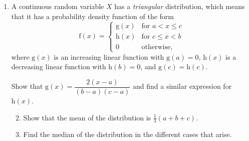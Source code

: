 \documentclass[a4, 11pt]{report}
\newlength{\qspace}
\newcounter{qnumber}
\newenvironment{question}%
 {\vspace{\qspace}
  \begin{enumerate}[\bfseries 1\quad][10]%
    \setcounter{enumi}{\value{qnumber}}%
    \item%
 }
{
  \end{enumerate}
  \filbreak
  \stepcounter{qnumber}
 }
\newenvironment{questionparts}[1][1]%
 {
  \begin{enumerate}[\bfseries (i)]%
    \setcounter{enumii}{#1}
    \addtocounter{enumii}{-1}
    \setlength{\itemsep}{5mm}
    \setlength{\parskip}{8pt}
 }
 {
  \end{enumerate}
 }
\def\le{\leqslant}
\renewcommand{\.}[1]{\ensuremath{\mathrm{#1}}}
\newcommand{\+}[1]{\ensuremath{\mathbf{#1}}}
\begin{document}
\begin{question}
  A continuous random variable $X$ has a \emph{triangular}
  distribution, which means that it has a   probability density function 
  of the form
  \[
  \.f(x) =
  \begin{cases}
    \.g(x) & \text{for $a<   x \le c$}  \\
    \.h(x) & \text{for   $c\le x <   b$} \\
    0 & \text{otherwise,}
  \end{cases}
  \]
  where $\.g(x)$ is an increasing linear function with $\.g(a)=0$,
  $\.h(x)$ is a decreasing linear function with $\.h(b) =0$, and
  $\.g(c)=\.h(c)$.

  Show that $\.g(x) = \dfrac{2(x-a)}{(b-a)(c-a)}$ and find a similar
  expression for $\.h(x)$.

  \begin{questionparts}
  \item Show that the mean of the distribution is $\frac13(a+b+c)$.
  \item Find the median of the distribution in the different cases that arise.
  \end{questionparts}
\end{question}
\end{document}
